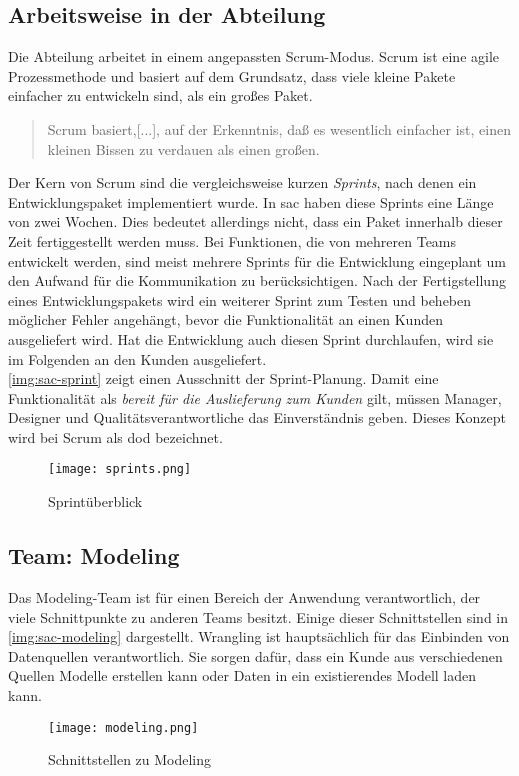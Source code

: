 \subsection{Arbeitsweise in der Abteilung}
Die Abteilung arbeitet in einem angepassten Scrum-Modus. Scrum ist eine agile Prozessmethode und basiert 
auf dem Grundsatz, dass viele kleine Pakete einfacher zu entwickeln sind, als ein großes Paket. 
\begin{quote} Scrum basiert,[...], auf der Erkenntnis, daß es wesentlich einfacher ist, einen kleinen Bissen zu verdauen als einen großen.\cite{scrum:2018} \end{quote} 
Der Kern von Scrum sind die vergleichsweise kurzen \textit{Sprints}, nach denen ein Entwicklungspaket implementiert wurde. 
In \ac{sac} haben diese Sprints eine Länge von zwei Wochen. Dies bedeutet allerdings nicht, dass ein Paket 
innerhalb dieser Zeit fertiggestellt werden muss. 
Bei Funktionen, die von mehreren Teams entwickelt werden, sind meist mehrere Sprints für die Entwicklung eingeplant um den Aufwand für die Kommunikation zu berücksichtigen. 
Nach der Fertigstellung eines Entwicklungspakets wird ein weiterer Sprint zum Testen und beheben möglicher Fehler angehängt, bevor die Funktionalität an einen Kunden
ausgeliefert wird. Hat die Entwicklung auch diesen Sprint durchlaufen, 
wird sie im Folgenden an den Kunden ausgeliefert.\\
\autoref{img:sac-sprint} zeigt einen Ausschnitt der Sprint-Planung.
Damit eine Funktionalität als \textit{bereit für die Auslieferung zum Kunden} gilt, müssen Manager, Designer und Qualitätsverantwortliche das 
Einverständnis geben. Dieses Konzept wird bei Scrum als \ac{dod} bezeichnet. 
\begin{figure}[h]
	\centering
	\texttt{[image: sprints.png]}
	\caption{Sprintüberblick}
	\label{img:sac-sprint}
\end{figure}



\subsection{Team: Modeling}
Das Modeling-Team ist für einen Bereich der Anwendung verantwortlich, der viele Schnittpunkte zu anderen Teams besitzt.
Einige dieser Schnittstellen sind in \autoref{img:sac-modeling} dargestellt. Wrangling ist hauptsächlich für das 
Einbinden von Datenquellen verantwortlich. Sie sorgen dafür, dass ein Kunde aus verschiedenen Quellen Modelle erstellen kann oder Daten in 
ein existierendes Modell laden kann. 
\begin{figure}[ht]
	\centering
	\texttt{[image: modeling.png]}
	\caption{Schnittstellen zu Modeling}
	\label{img:sac-modeling}
\end{figure}

